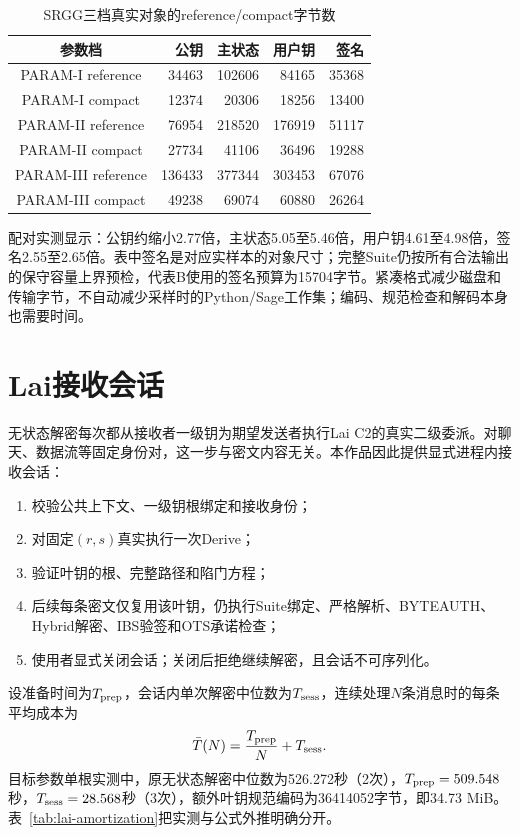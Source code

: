 \documentclass[UTF8,a4paper,12pt,oneside,openany,fontset=fandol]{ctexrep}
\begin{document}
\begin{table}[htbp]
\centering
\small
\caption{SRGG三档真实对象的reference/compact字节数}
\label{tab:srgg-compact-sizes}
\begin{tabular}{@{}crrrr@{}}
\toprule
\rowcolor{black!8} 参数档 & 公钥 & 主状态 & 用户钥 & 签名 \\
\midrule
PARAM-I reference & 34463 & 102606 & 84165 & 35368 \\
PARAM-I compact & 12374 & 20306 & 18256 & 13400 \\
PARAM-II reference & 76954 & 218520 & 176919 & 51117 \\
PARAM-II compact & 27734 & 41106 & 36496 & 19288 \\
PARAM-III reference & 136433 & 377344 & 303453 & 67076 \\
PARAM-III compact & 49238 & 69074 & 60880 & 26264 \\
\bottomrule
\end{tabular}
\end{table}

配对实测显示：公钥约缩小2.77倍，主状态5.05至5.46倍，用户钥4.61至4.98倍，签名2.55至2.65倍。表中签名是对应实样本的对象尺寸；完整Suite仍按所有合法输出的保守容量上界预检，代表B使用的签名预算为15704字节。紧凑格式减少磁盘和传输字节，不自动减少采样时的Python/Sage工作集；编码、规范检查和解码本身也需要时间。

\section{Lai接收会话}
无状态解密每次都从接收者一级钥为期望发送者执行Lai C2的真实二级委派。对聊天、数据流等固定身份对，这一步与密文内容无关。本作品因此提供显式进程内接收会话：

\begin{enumerate}
  \item 校验公共上下文、一级钥根绑定和接收身份；
  \item 对固定$(r,s)$真实执行一次Derive；
  \item 验证叶钥的根、完整路径和陷门方程；
  \item 后续每条密文仅复用该叶钥，仍执行Suite绑定、严格解析、BYTEAUTH、Hybrid解密、IBS验签和OTS承诺检查；
  \item 使用者显式关闭会话；关闭后拒绝继续解密，且会话不可序列化。
\end{enumerate}

设准备时间为$T_{\rm prep}$，会话内单次解密中位数为$T_{\rm sess}$，连续处理$N$条消息时的每条平均成本为
\[
  \bar T(N)=\frac{T_{\rm prep}}{N}+T_{\rm sess}.
\]
目标参数单根实测中，原无状态解密中位数为526.272秒（2次），$T_{\rm prep}=509.548$秒，$T_{\rm sess}=28.568$秒（3次），额外叶钥规范编码为36414052字节，即34.73 MiB。表~\ref{tab:lai-amortization}把实测与公式外推明确分开。
\end{document}
